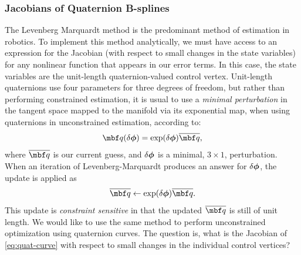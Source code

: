 \documentclass[11pt,a4paper,oneside]{article}
\begin{document}
\subsubsection{Jacobians of Quaternion B-splines}
The Levenberg Marquardt method is the predominant method of estimation in robotics. To implement this method analytically, we must have access to an expression for the Jacobian (with respect to small changes in the state variables) for any nonlinear function that appears in our error terms. In this case, the state variables are the unit-length quaternion-valued control vertex.
Unit-length quaternions use four parameters for three degrees of freedom, but rather than performing constrained estimation, it is usual to use a {\em minimal perturbation} in the tangent space mapped to the manifold via its exponential map, when using quaternions in unconstrained estimation, according to:
\begin{equation}
	\label{eq:q-perturbed}
	\mbf q(\mbsdel \phi ) = \exp(\mbsdel \phi)\mbfbar q ,
\end{equation}
where
$\mbfbar q$ is our current guess, and ${\delta {\boldsymbol{\phi}}}$ is a minimal, $3 \times 1$, perturbation. When an iteration of Levenberg-Marquardt produces an answer for ${\delta {\boldsymbol{\phi}}}$, the update is applied as
\begin{equation}
  \label{eq:q-update}
  \mbfbar q \leftarrow \exp(\mbsdel \phi)\mbfbar q.
\end{equation}
This update is {\em constraint sensitive} in that the updated $\mbfbar q$ is still of unit length. We would like to use the same method to perform unconstrained optimization using quaternion curves. The question is, what is the Jacobian of \eqref{eq:quat-curve} with respect to small changes in the individual control vertices?
\end{document}
